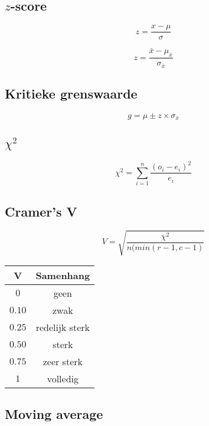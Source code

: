 \documentclass[a4paper]{article}
\begin{document}
\subsection{$z$-score}

\begin{equation}
z = \frac{x- \mu}{\sigma}
\end{equation}

\begin{equation}
z = \frac{\bar{x} - \mu_{\bar{x}}}{\sigma_{\bar{x}}}
\end{equation}

\subsection{Kritieke grenswaarde}

\begin{equation}
g = \mu \pm z \times \sigma_{\bar{x}}
\end{equation}

\subsection{$\chi^2$}

\begin{equation}
\chi^2 = \sum_{i=1}^{n} \frac{(o_i - e_i)^2}{e_i}
\end{equation}

\subsection{Cramer's V}

\begin{equation}
V = \sqrt{\frac{\chi^2}{n(min(r - 1, c - 1)}}
\end{equation}

\begin{tabular}{c|c}
V & Samenhang \\ \hline
$0$ & geen \\ \hline
$0.10$ & zwak \\ \hline
$0.25$ & redelijk sterk \\ \hline
$0.50$ & sterk \\ \hline
$0.75$ & zeer sterk \\ \hline
$1$ & volledig \\
\end{tabular}

\subsection{Moving average}
\end{document}
